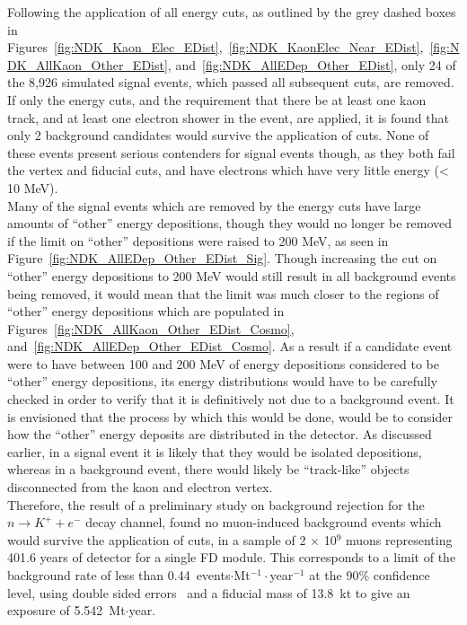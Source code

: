 Following the application of all energy cuts, as outlined by the grey dashed boxes in Figures~\ref{fig:NDK_Kaon_Elec_EDist},~\ref{fig:NDK_KaonElec_Near_EDist},~\ref{fig:NDK_AllKaon_Other_EDist}, and~\ref{fig:NDK_AllEDep_Other_EDist}, only 24 of the 8,926 simulated signal events, which passed all subsequent cuts, are removed. If only the energy cuts, and the requirement that there be at least one kaon track, and at least one electron shower in the event, are applied, it is found that only 2 background candidates would survive the application of cuts. None of these events present serious contenders for signal events though, as they both fail the vertex and fiducial cuts, and have electrons which have very little energy (< 10 MeV). \\

Many of the signal events which are removed by the energy cuts have large amounts of ``other'' energy depositions, though they would no longer be removed if the limit on ``other'' depositions were raised to 200 MeV, as seen in Figure~\ref{fig:NDK_AllEDep_Other_EDist_Sig}. Though increasing the cut on ``other'' energy depositions to 200 MeV would still result in all background events being removed, it would mean that the limit was much closer to the regions of ``other'' energy depositions which are populated in Figures~\ref{fig:NDK_AllKaon_Other_EDist_Cosmo}, and~\ref{fig:NDK_AllEDep_Other_EDist_Cosmo}. As a result if a candidate event were to have between 100 and 200 MeV of energy depositions considered to be ``other'' energy depositions, its energy distributions would have to be carefully checked in order to verify that it is definitively not due to a background event. It is envisioned that the process by which this would be done, would be to consider how the ``other'' energy deposits are distributed in the detector. As discussed earlier, in a signal event it is likely that they would be isolated depositions, whereas in a background event, there would likely be ``track-like'' objects disconnected from the kaon and electron vertex. \\

Therefore, the result of a preliminary study on background rejection for the $n \rightarrow K^{+} + e^{-}$ decay channel, found no muon-induced background events which would survive the application of cuts, in a sample of 2 $\times$ 10$^9$ muons representing 401.6 years of detector for a single FD module. This corresponds to a limit of the background rate of less than 0.44~events$\cdot$Mt$^{-1}\cdot$year$^{-1}$ at the 90\% confidence level, using double sided errors~\citep{PDGReview} and a fiducial mass of 13.8~kt to give an exposure of 5.542~Mt$\cdot$year. \\

